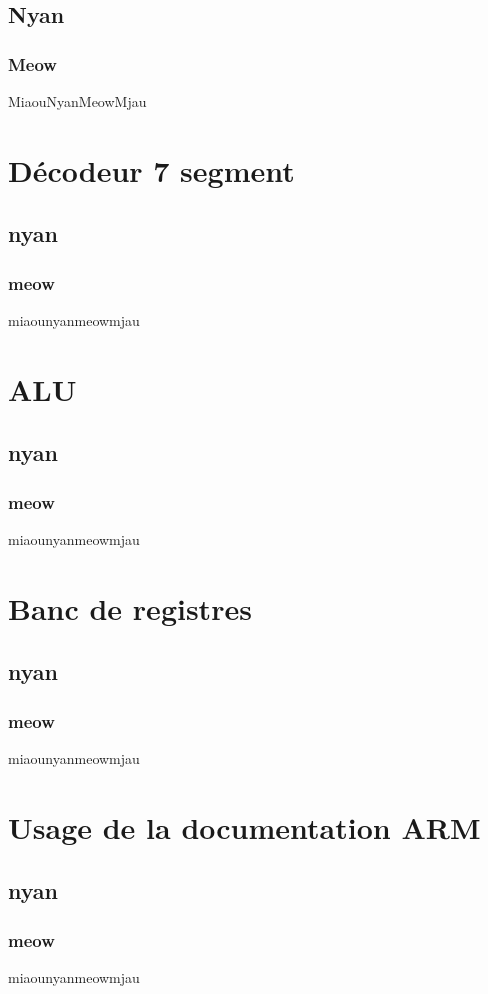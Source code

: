 \documentclass{article}
\newcounter{subsubsubsection}[subsubsection]
\begin{document}
\subsection{Nyan}
\subsubsection{Meow}
MiaouNyanMeowMjau

\section{Décodeur 7 segment}
\subsection{nyan}
\subsubsection{meow}
miaounyanmeowmjau

\section{ALU}
\subsection{nyan}
\subsubsection{meow}
miaounyanmeowmjau

\section{Banc de registres}
\subsection{nyan}
\subsubsection{meow}
miaounyanmeowmjau

\section{Usage de la documentation ARM}
\subsection{nyan}
\subsubsection{meow}
miaounyanmeowmjau
\end{document}
